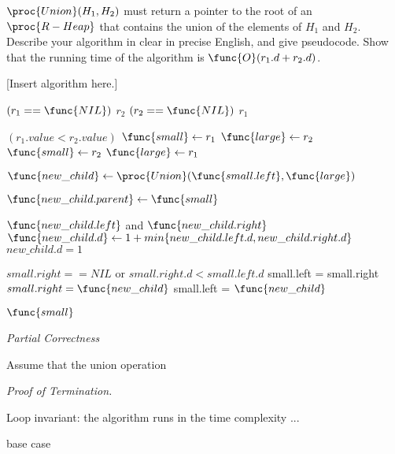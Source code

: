 \documentclass[11pt, answers]{exam}
\theoremstyle{plain}
\theoremstyle{definition}
\begin{document}
\begin{questions}
\begin{parts}
$\proc{Union}(H_1,H_2)$ must return a pointer to the root of an $\proc{R-Heap}$ that contains the union of the elements of $H_1$ and $H_2$. Describe your algorithm in clear in precise English, and give pseudocode. Show that the running time of the algorithm is $\func{O}(r_1 .d + r_2 .d)$.

\begin{solution}

[Insert algorithm here.]

\begin{codebox}


\li \If $(r_1 == \func{NIL})$ \Then
\li 	\Return $r_2$
\li \ElseIf $(r_2 == \func{NIL})$ \Then
\li 	\Return $r_1$
\li \Else


\li	\If $(r_1.value	< r_2.value)$ \Then
\li		$\func{small} \gets r_1 $
\li		$\func{large} \gets r_2$
\li	\Else
\li		$\func{small} \gets r_2 $
\li		$\func{large} \gets r_1$
		\End
		
		
\li	$\func{new\_child} \gets \proc{Union}(\func{small.left}, \func{large})$


\li $\func{new\_child.parent} \gets \func{small}$

\li \If $\func{new\_child.left}$ and $\func{new\_child.right}$ \Then
\li $\func{new\_child.d} \gets {1+min\{new\_child.left.d, new\_child.right.d\}}$
\li \Else 
\li     ${new\_child.d = 1}$
        \End

\li \If $small.right == NIL$ or $small.right.d < small.left.d$   \Then
\li     small.left = small.right
\li     $small.right = \func{new\_child}$
\li \Else
\li     small.left = $\func{new\_child}$
        \End

\li 	\Return $\func{small}$
	\End
\end{codebox}

\textit{Partial Correctness}

Assume that the union operation 

\textit{Proof of Termination.}

Loop invariant: the algorithm runs in the time complexity ...

base case 


\end{solution}


\end{parts}
\end{questions}
\end{document}
